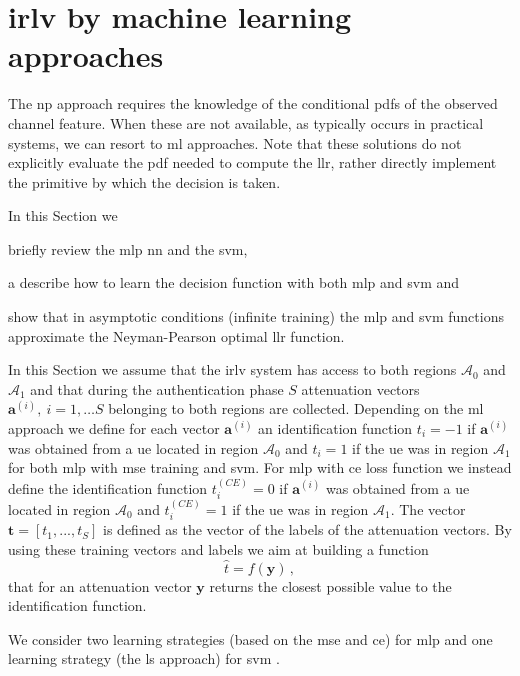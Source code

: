 \documentclass[draftcls,onecolumn,12pt]{IEEEtran}
\newcommand{\ai}{\mathbf{a}^{(i)}}
\begin{document}
\section{\Ac{irlv} by machine learning approaches}
The \ac{np} approach requires the knowledge of the conditional \acp{pdf} of the observed channel feature. When these are not available, as typically occurs in practical systems, we can resort to \ac{ml} approaches. Note that these solutions do not explicitly evaluate the \ac{pdf} needed to compute the \ac{llr}, rather directly implement the primitive by which the decision is taken.

In this Section we \begin{enumerate*}[label=\alph*)]
\item briefly review the \ac{mlp} \ac{nn} and the \ac{svm}, \item a describe how to learn the decision function with both \ac{mlp} and \ac{svm} and \item show that in asymptotic conditions (infinite training) the \ac{mlp} and \ac{svm} functions approximate the Neyman-Pearson optimal \ac{llr} function.
\end{enumerate*}

In this Section we assume that the \ac{irlv} system has access to both regions $\mathcal{A}_0$ and $\mathcal{A}_1$ and that during the authentication phase $S$ attenuation vectors $\ai, \ i=1,\dots S$  belonging to both regions are collected. Depending on the \ac{ml} approach we define for each vector $\ai$ an identification function $t_i = -1$ if $\ai$ was obtained from a \ac{ue} located in region $\mathcal{A}_0$ and $t_i = 1$ if the \ac{ue} was in region $\mathcal{A}_1$ for both \ac{mlp} with \ac{mse} training and \ac{svm}. For \ac{mlp} with \ac{ce} loss function we instead define the identification function $t_i^{(CE)}=0$ if $\ai$ was obtained from a \ac{ue} located in region $\mathcal{A}_0$ and $t_i^{(CE)}= 1$ if the \ac{ue} was in region $\mathcal{A}_1$. The vector $\bm{t}=[t_1,...,t_S]$ is defined as the vector of the labels of the attenuation vectors. By using these training vectors and labels we aim at building a function
\begin{equation}
    \hat{t} = f(\bm{y}) \,,
\end{equation}
that for an attenuation vector $\bm{y}$ returns the closest possible value to the identification function.

We consider two learning strategies (based on the \ac{mse} and \ac{ce}) for \ac{mlp} \cite{Bishop2006} and one learning strategy (the \ac{ls} approach) for \ac{svm} \cite{Suykens1999}.
\end{document}
